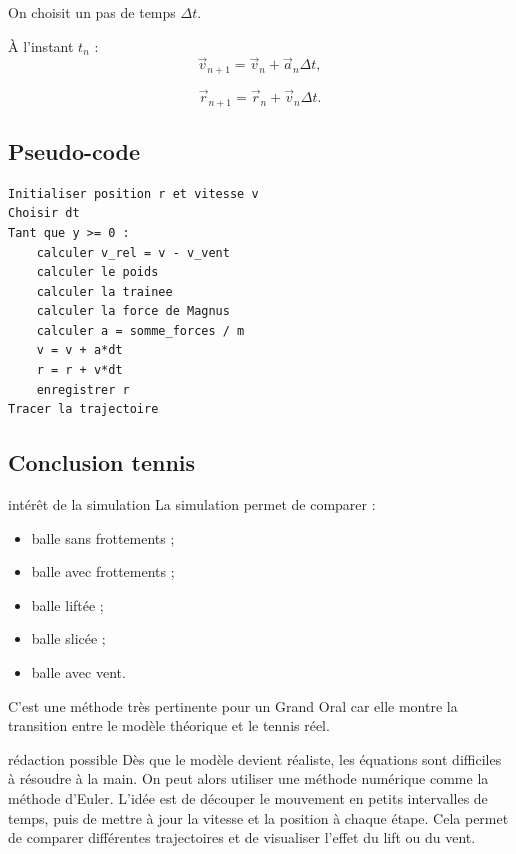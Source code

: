 \documentclass[11pt,a4paper]{article}
\begin{document}
On choisit un pas de temps $\Delta t$.

À l'instant $t_n$ :
\[
\vec{v}_{n+1}=\vec{v}_n+\vec{a}_n\Delta t,
\]

\[
\vec{r}_{n+1}=\vec{r}_n+\vec{v}_n\Delta t.
\]

\subsection{Pseudo-code}

\begin{verbatim}
Initialiser position r et vitesse v
Choisir dt
Tant que y >= 0 :
    calculer v_rel = v - v_vent
    calculer le poids
    calculer la trainee
    calculer la force de Magnus
    calculer a = somme_forces / m
    v = v + a*dt
    r = r + v*dt
    enregistrer r
Tracer la trajectoire
\end{verbatim}

\subsection{Conclusion tennis}

\begin{tennis}{intérêt de la simulation}
La simulation permet de comparer :
\begin{itemize}
    \item balle sans frottements ;
    \item balle avec frottements ;
    \item balle liftée ;
    \item balle slicée ;
    \item balle avec vent.
\end{itemize}

C'est une méthode très pertinente pour un Grand Oral car elle montre la transition entre le modèle théorique et le tennis réel.
\end{tennis}

\begin{oral}{rédaction possible}
Dès que le modèle devient réaliste, les équations sont difficiles à résoudre à la main. On peut alors utiliser une méthode numérique comme la méthode d'Euler. L'idée est de découper le mouvement en petits intervalles de temps, puis de mettre à jour la vitesse et la position à chaque étape. Cela permet de comparer différentes trajectoires et de visualiser l'effet du lift ou du vent.
\end{oral}

\end{document}
